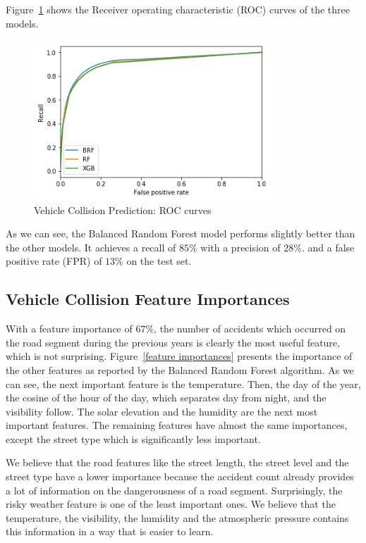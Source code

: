 \documentclass[conference]{IEEEtran}
\begin{document}
Figure~\ref{fig:roc} shows the Receiver operating characteristic (ROC) curves of the three models.

\begin{figure}[htbp]
\centerline{\includegraphics[height=6cm, keepaspectratio]{figures/roc.png}}
\caption{Vehicle Collision Prediction: ROC curves}
\label{fig:roc}
\end{figure}

As we can see, the Balanced Random Forest model performs slightly better than the other models.
It achieves a recall of $85\%$ with a precision of $28\%$. and a false positive rate (FPR) of $13\%$ on the test set.

\subsection{Vehicle Collision Feature Importances}
With a
feature importance of $67\%$, the number of accidents which occurred on the
road segment during the previous years is clearly the most useful feature, which
is not surprising. Figure~\ref{feature importances} presents the
importance of the other features as reported by the Balanced Random Forest
algorithm. As we can see, the next important feature is the temperature. 
Then, the day of the year, the cosine of the hour of the day, which separates day from night,
and the visibility follow. The solar elevation and the humidity are the next most important features. The remaining features have almost the same importances, except the street type which
is significantly less important.

We believe that the road features like the street length, the street level and the street type have a lower importance because the accident count already provides a lot of information on the dangerousness of a road segment. Surprisingly, the risky weather feature is one of the least important ones. We believe that the temperature, the visibility, the humidity and the atmospheric pressure contains this information in a way that is easier to learn. 
\end{document}
